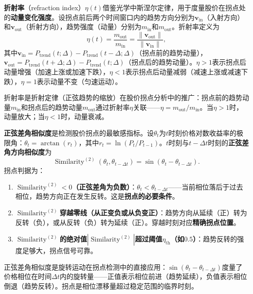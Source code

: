 \begin{definition}\label{def:refraction_index_stock}
\textbf{折射率}（refraction index）$\eta(t)$借鉴光学中斯涅尔定律，用于度量股价在拐点处的\textbf{动量变化强度}。设拐点前后两个时间窗口内的趋势方向分别为$\mathbf{v}_{\text{in}}$（入射方向）和$\mathbf{v}_{\text{out}}$（折射方向），趋势强度（动量）分别为$m_{\text{in}}$和$m_{\text{out}}$。折射率定义为
\[
\eta(t) = \frac{m_{\text{out}}}{m_{\text{in}}} = \frac{\|\mathbf{v}_{\text{out}}\|}{\|\mathbf{v}_{\text{in}}\|},
\]
其中$\mathbf{v}_{\text{in}} = P_{\text{trend}}(t; \Delta) - P_{\text{trend}}(t-\Delta; \Delta)$（拐点前的趋势动量），$\mathbf{v}_{\text{out}} = P_{\text{trend}}(t+\Delta; \Delta) - P_{\text{trend}}(t; \Delta)$（拐点后的趋势动量）。$\eta > 1$表示拐点后动量增强（加速上涨或加速下跌），$\eta < 1$表示拐点后动量减弱（减速上涨或减速下跌），$\eta = 1$表示动量不变（匀速运动）。

折射率是折射定律（正弦趋势的缩放）在股价拐点分析中的推广：拐点前的趋势动量$m_{\text{in}}$和拐点后的趋势动量$m_{\text{out}}$通过折射率$\eta$关联——$\eta = m_{\text{out}}/m_{\text{in}}$。当$\eta > 1$时，动量放大；当$\eta < 1$时，动量衰减。
\end{definition}

\begin{proposition}[正弦差角相似度与拐点判据]\label{prop:sine_diff_inflection}
\textbf{正弦差角相似度}是检测股价拐点的最敏感指标。设$\theta_t$为$t$时刻价格对数收益率的极限角：$\theta_t = \arctan(r_t)$，其中$r_t = \ln(P_t/P_{t-1})$。$t$时刻与$t-\Delta t$时刻的\textbf{正弦差角方向相似度}为
\[
\operatorname{Similarity}^{(2)}(\theta_t, \theta_{t-\Delta t}) = \sin(\theta_t - \theta_{t-\Delta t}).
\]
拐点判据为：
\begin{enumerate}[label=(\roman*)]
    \item \textbf{$\operatorname{Similarity}^{(2)} < 0$（正弦差角为负数）}：$\theta_t < \theta_{t-\Delta t}$——当前相位落后于过去相位，趋势方向正在发生反转。这是\textbf{拐点的必要条件}。
    \item \textbf{$\operatorname{Similarity}^{(2)}$穿越零线（从正变负或从负变正）}：趋势方向从延续（正）转为反转（负），或从反转（负）转为延续（正）。穿越时刻对应\textbf{精确拐点位置}。
    \item \textbf{$\operatorname{Similarity}^{(2)}$的绝对值$|\operatorname{Similarity}^{(2)}|$超过阈值$\eta_{\text{th}}$（如$0.5$）}：趋势反转的强度足够大，拐点信号可靠。
\end{enumerate}
正弦差角相似度是旋转运动在拐点检测中的直接应用：$\sin(\theta_t - \theta_{t-\Delta t})$度量了价格相位在时间$\Delta t$内的旋转量——正值表示相位前进（趋势延续），负值表示相位倒退（趋势反转）。拐点是相位漂移量超过稳定范围的临界时刻。
\end{proposition}

